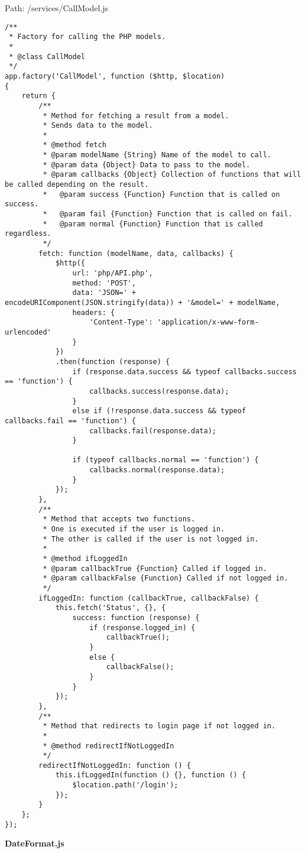 Path: /services/CallModel.js
{\scriptsize
\begin{lstlisting}
/**
 * Factory for calling the PHP models.
 *
 * @class CallModel
 */
app.factory('CallModel', function ($http, $location)
{
	return {
		/**
		 * Method for fetching a result from a model.
		 * Sends data to the model.
		 *
		 * @method fetch
		 * @param modelName {String} Name of the model to call.
		 * @param data {Object} Data to pass to the model.
		 * @param callbacks {Object} Collection of functions that will be called depending on the result.
		 *   @param success {Function} Function that is called on success.
		 *   @param fail {Function} Function that is called on fail.
		 *   @param normal {Function} Function that is called regardless.
		 */
		fetch: function (modelName, data, callbacks) {
			$http({
				url: 'php/API.php',
				method: 'POST',
				data: 'JSON=' + encodeURIComponent(JSON.stringify(data)) + '&model=' + modelName,
				headers: {
					'Content-Type': 'application/x-www-form-urlencoded'
				}
			})
			.then(function (response) {
				if (response.data.success && typeof callbacks.success == 'function') {
					callbacks.success(response.data);
				}
				else if (!response.data.success && typeof callbacks.fail == 'function') {
					callbacks.fail(response.data);
				}

				if (typeof callbacks.normal == 'function') {
					callbacks.normal(response.data);
				}
			});
		},
		/**
		 * Method that accepts two functions.
		 * One is executed if the user is logged in.
		 * The other is called if the user is not logged in.
		 *
		 * @method ifLoggedIn
		 * @param callbackTrue {Function} Called if logged in.
		 * @param callbackFalse {Function} Called if not logged in.
		 */
		ifLoggedIn: function (callbackTrue, callbackFalse) {
			this.fetch('Status', {}, {
				success: function (response) {
					if (response.logged_in) {
						callbackTrue();
					}
					else {
						callbackFalse();
					}
				}
			});
		},
		/**
		 * Method that redirects to login page if not logged in.
		 *
		 * @method redirectIfNotLoggedIn
		 */
		redirectIfNotLoggedIn: function () {
			this.ifLoggedIn(function () {}, function () {
				$location.path('/login');
			});
		}
	};
});\end{lstlisting}
}
\textbf{DateFormat.js}\label{DateFormat.js}

